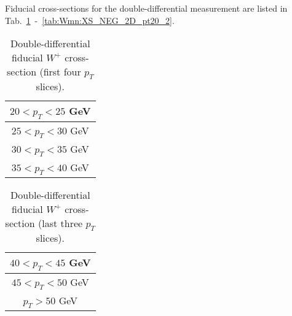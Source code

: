 
Fiducial cross-sections for the double-differential measurement are listed in Tab.~\ref{tab:Wmn:XS_POS_2D_pt20_1}~-~\ref{tab:Wmn:XS_NEG_2D_pt20_2}.

\begin{table}
\footnotesize
  \begin{center}
\begin{tabular}{lc}
\hline

\hline
\multicolumn{2}{c}{$20 < p_T < 25$ GeV} \\
\hline


\hline
\multicolumn{2}{c}{$25 < p_T < 30$ GeV} \\
\hline


\hline
\multicolumn{2}{c}{$30 < p_T < 35$ GeV} \\
\hline


\hline
\multicolumn{2}{c}{$35 < p_T < 40$ GeV} \\
\hline


    \hline
    \end{tabular}
    \caption{ Double-differential fiducial $W^+$ cross-section (first four $p_T$ slices). }
    \label{tab:Wmn:XS_POS_2D_pt20_1}
  \end{center}
\end{table}

\begin{table}
\footnotesize
  \begin{center}
\begin{tabular}{lc}
\hline

\hline
\multicolumn{2}{c}{$40 < p_T < 45$ GeV} \\
\hline


\hline
\multicolumn{2}{c}{$45 < p_T < 50$ GeV} \\
\hline


\hline
\multicolumn{2}{c}{$p_T > 50$ GeV} \\
\hline


    \hline
    \end{tabular}
    \caption{ Double-differential fiducial $W^+$ cross-section (last three $p_T$ slices). }
    \label{tab:Wmn:XS_POS_2D_pt20_2}
  \end{center}
\end{table}

